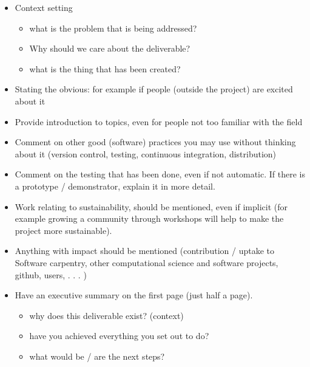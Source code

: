 \begin{itemize}
\item Context setting
  \begin{itemize}
  \item what is the problem that is being addressed?
  \item Why should we care about the deliverable?
  \item what is the thing that has been created?
  \end{itemize}

\item Stating the obvious: for example if people (outside the project)
  are excited about it

\item Provide introduction to topics, even for people not too familiar
  with the field
\item Comment on other good (software) practices you may use without
  thinking about it (version control, testing, continuous integration,
  distribution)

\item Comment on the testing that has been done, even if not
  automatic. If there is a prototype / demonstrator, explain it in
  more detail.
\item Work relating to sustainability, should be mentioned, even if
  implicit (for example growing a community through workshops will
  help to make the project more sustainable).

\item Anything with impact should be mentioned (contribution / uptake
  to Software carpentry, other computational science and software
  projects, github, users, . . . )

\item Have an executive summary on the
  first page (just half a page).
  \begin{itemize}
  \item why does this deliverable exist? (context)
  \item have you achieved everything you set out to do?
  \item what would be / are the next steps?
  \end{itemize}

\end{itemize}







